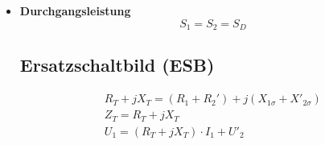 \begin{itemize}


    \item[]{\textbf{Durchgangsleistung}}
    \begin{equation*}
        S_{1} = S_{2} = S_{D}
    \end{equation*}

\subsection{Ersatzschaltbild (ESB)}

\begin{gather*}
    R_{T} + jX_{T} = (R_1+R_2')+j(X_{1\sigma}+X'_{2\sigma})\\
    Z_{T} = R_{T} + jX_{T}\\
    U_1 = (R_T + jX_T) \cdot I_1 + U'_2
\end{gather*}


\end{itemize}
